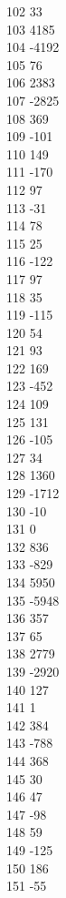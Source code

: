 { 102	33 \\
 103	4185 \\
 104	-4192 \\
 105	76 \\
 106	2383 \\
 107	-2825 \\
 108	369 \\
 109	-101 \\
 110	149 \\
 111	-170 \\
 112	97 \\
 113	-31 \\
 114	78 \\
 115	25 \\
 116	-122 \\
 117	97 \\
 118	35 \\
 119	-115 \\
 120	54 \\
 121	93 \\
 122	169 \\
 123	-452 \\
 124	109 \\
 125	131 \\
 126	-105 \\
 127	34 \\
 128	1360 \\
 129	-1712 \\
 130	-10 \\
 131	0 \\
 132	836 \\
 133	-829 \\
 134	5950 \\
 135	-5948 \\
 136	357 \\
 137	65 \\
 138	2779 \\
 139	-2920 \\
 140	127 \\
 141	1 \\
 142	384 \\
 143	-788 \\
 144	368 \\
 145	30 \\
 146	47 \\
 147	-98 \\
 148	59 \\
 149	-125 \\
 150	186 \\
 151	-55 \\
}
